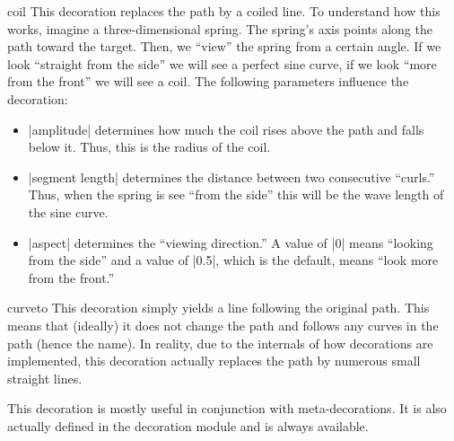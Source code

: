 \begin{decoration}{coil}
  This decoration replaces the path by a coiled line. To understand how this works,
  imagine a three-dimensional spring. The spring's axis points along
  the path toward the target. Then, we ``view'' the spring from a
  certain angle. If we look ``straight from the side'' we will see a
  perfect sine curve, if we look ``more from the front'' we will see a
  coil. The following parameters influence the decoration:
  \begin{itemize}
  \item |amplitude|
    determines how much the coil rises above the path and falls below
    it. Thus, this is the radius of the coil.
  \item |segment length|
    determines the distance between two consecutive ``curls.'' Thus,
    when the spring is see ``from the side'' this will be the wave
    length of the sine curve.
  \item |aspect|
    determines the ``viewing direction.'' A value of |0| means
    ``looking from the side'' and a value of |0.5|, which is the
    default, means ``look more from the front.''
  \end{itemize}
\begin{codeexample}[]
\end{codeexample}
\begin{codeexample}[]
\end{codeexample}
\end{decoration}



\begin{decoration}{curveto}
  This decoration simply yields a line following the original
  path. This means that (ideally) it does not change the path and
  follows any curves in the path (hence the name). In
  reality, due to the internals of how decorations are implemented,
  this decoration actually replaces the path by numerous small
  straight lines.

  This decoration is mostly useful in conjunction with
  meta-decorations. It is also actually defined in the decoration
  module and is always available.

\begin{codeexample}[]
\end{codeexample}
\end{decoration}



